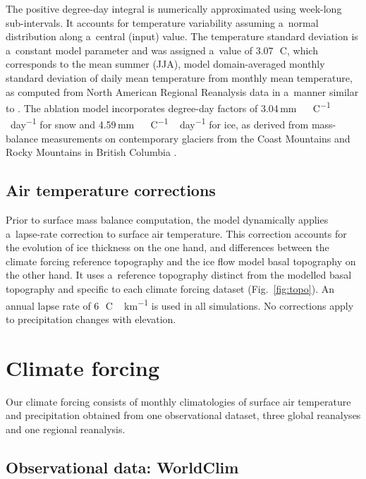 \documentclass[tc, ms]{copernicus}
\begin{document}
The positive degree-day integral \citep{calov-greve-2005} is numerically approximated using week-long sub-intervals. It accounts for temperature variability assuming a~normal distribution along a~central (input) value. The temperature standard deviation is a~constant model parameter and was assigned a~value of 3.07\,\unit{{\degree}C}, which corresponds to the mean summer (JJA), model domain-averaged monthly standard deviation of daily mean temperature from monthly mean temperature, as computed from North American Regional Reanalysis data \citep{data:narr} in a~manner similar to \citet{seguinot-2013}. The ablation model incorporates degree-day factors of 3.04\,\unit{mm\,{\degree}C^{-1}\,day^{-1}} for snow and 4.59\,\unit{mm\,{\degree}C^{-1}\,day^{-1}} for ice, as derived from mass-balance measurements on contemporary glaciers from the Coast Mountains and Rocky Mountains in British Columbia \citep{shea-etal-2009}.

\subsection{Air temperature corrections}

Prior to surface mass balance computation, the model dynamically applies a~lapse-rate correction to surface air temperature. This correction accounts for the evolution of ice thickness on the one hand, and differences between the climate forcing reference topography and the ice flow model basal topography on the other hand. It uses a~reference topography distinct from the modelled basal topography and specific to each climate forcing dataset (Fig.~\ref{fig:topo}). An annual lapse rate of 6\,\unit{{\degree}C\,km^{-1}} is used in all simulations. No corrections apply to precipitation changes with elevation.

\section{Climate forcing}
\label{sec:climate}

Our climate forcing consists of monthly climatologies of surface air temperature and precipitation obtained from one observational dataset, three global reanalyses and one regional reanalysis.

\subsection{Observational data: WorldClim}
\end{document}
